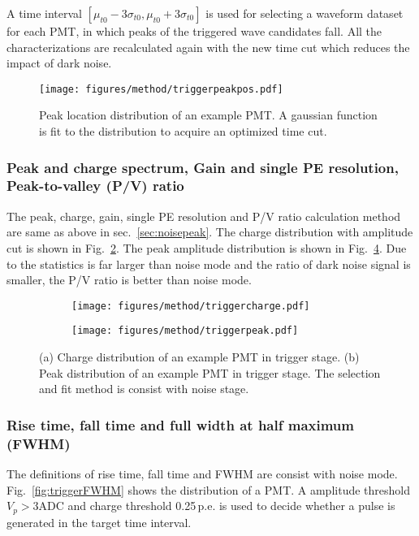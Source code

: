 A time interval $[\mu_{t0}-3\sigma_{t0}, \mu_{t0}+3\sigma_{t0}]$ is used for selecting a waveform dataset for each PMT, in which peaks of the triggered wave candidates fall. All the characterizations are recalculated again with the new time cut which reduces the impact of dark noise.

\begin{figure}[!htbp]
    \centering
    \texttt{[image: figures/method/triggerpeakpos.pdf]}
    \caption{Peak location distribution of an example PMT. A gaussian function is fit to the distribution to acquire an optimized time cut.}%
    \label{fig:peaklocation}
\end{figure}

\subsubsection{Peak and charge spectrum, Gain and single PE resolution, Peak-to-valley (P/V) ratio}
\label{sec:triggerpeak}
The peak, charge, gain, single PE resolution and P/V ratio calculation method are same as above in sec.~\ref{sec:noisepeak}. The charge distribution with amplitude cut is shown in Fig.~\ref{fig:triggercharge}. The peak amplitude distribution is shown in Fig.~\ref{fig:triggerpeak}. Due to the statistics is far larger than noise mode and the ratio of dark noise signal is smaller, the P/V ratio is better than noise mode.
\begin{figure}[!htbp]
    \centering
    \begin{subfigure}[b]{0.49\textwidth}
        \texttt{[image: figures/method/triggercharge.pdf]}
        \caption{}%
        \label{fig:triggercharge}
    \end{subfigure}
    \begin{subfigure}[b]{0.49\textwidth}
        \texttt{[image: figures/method/triggerpeak.pdf]}
        \caption{}%
        \label{fig:triggerpeak}
    \end{subfigure}
    \caption{(a) Charge distribution of an example PMT in trigger stage. (b) Peak distribution of an example PMT in trigger stage. The selection and fit method is consist with noise stage.}
\end{figure}

\subsubsection{Rise time, fall time and full width at half maximum (FWHM)}
\label{sec:triggerFWHM}
The definitions of rise time, fall time and FWHM are consist with noise mode. Fig.~\ref{fig:triggerFWHM} shows the distribution of a PMT. A amplitude threshold $V_{p}>3\mathrm{ADC}$ and charge threshold 0.25\,p.e. is used to decide whether a pulse is generated in the target time interval.

